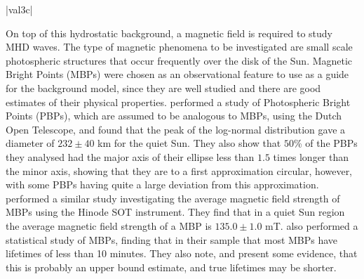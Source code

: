 \py[chapter3]|val3c|

On top of this hydrostatic background, a magnetic field is required to study MHD waves.
The type of magnetic phenomena to be investigated are small scale photospheric structures that occur frequently over the disk of the Sun.
Magnetic Bright Points (MBPs) were chosen as an observational feature to use as a guide for the background model, since they are well studied and there are good estimates of their physical properties.
\cite{feng2013} performed a study of Photospheric Bright Points (PBPs), which are assumed to be analogous to MBPs, using the Dutch Open Telescope, and found that the peak of the log-normal distribution gave a diameter of $232\pm40$ km for the quiet Sun.
They also show that $50$\% of the PBPs they analysed had the major axis of their ellipse less than $1.5$ times longer than the minor axis, showing that they are to a first approximation circular, however, with some PBPs having quite a large deviation from this approximation.
\cite{utz2013} performed a similar study investigating the average magnetic field strength of MBPs using the Hinode SOT instrument.
They find that in a quiet Sun region the average magnetic field strength of a MBP is $135.0 \pm 1.0$ mT.
\cite{sanchezalmeida2004} also performed a statistical study of MBPs, finding that in their sample that most MBPs have lifetimes of less than 10 minutes.
They also note, and present some evidence, that this is probably an upper bound estimate, and true lifetimes may be shorter.


